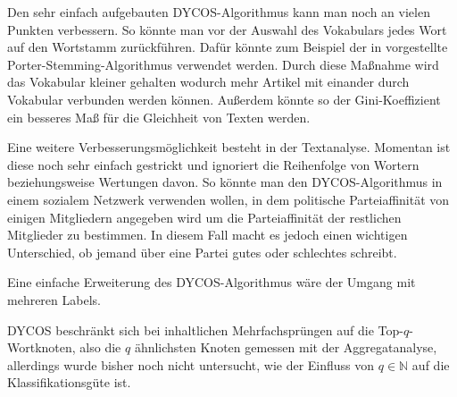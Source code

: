Den sehr einfach aufgebauten DYCOS-Algorithmus kann man noch an
vielen Punkten verbessern. So könnte man vor der Auswahl des
Vokabulars jedes Wort auf den Wortstamm zurückführen.
Dafür könnte zum Beispiel der in \cite{porter} vorgestellte 
Porter-Stemming-Algorithmus verwendet werden. Durch diese Maßnahme wird das
Vokabular kleiner gehalten wodurch mehr Artikel mit einander
durch Vokabular verbunden werden können. Außerdem könnte so der 
Gini-Koeffizient ein besseres Maß für die Gleichheit von Texten werden.

Eine weitere Verbesserungsmöglichkeit besteht in der Textanalyse.
Momentan ist diese noch sehr einfach gestrickt und ignoriert die
Reihenfolge von Wortern beziehungsweise Wertungen davon. So könnte
man den DYCOS-Algorithmus in einem sozialem Netzwerk verwenden wollen,
in dem politische Parteiaffinität von einigen Mitgliedern angegeben
wird um die Parteiaffinität der restlichen Mitglieder zu bestimmen.
In diesem Fall macht es jedoch einen wichtigen Unterschied, ob jemand
über eine Partei gutes oder schlechtes schreibt.

Eine einfache Erweiterung des DYCOS-Algorithmus wäre der Umgang mit 
mehreren Labels.

DYCOS beschränkt sich bei inhaltlichen Mehrfachsprüngen
auf die Top-$q$-Wortknoten, also die $q$ ähnlichsten Knoten
gemessen mit der Aggregatanalyse, allerdings wurde bisher noch nicht
untersucht, wie der Einfluss von $q \in \mathbb{N}$ auf die 
Klassifikationsgüte ist.
